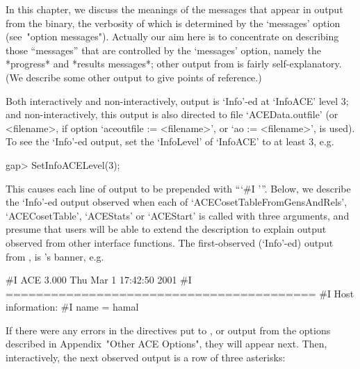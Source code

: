 

In this chapter, we discuss the meanings of the messages  that  appear
in output from the {\ACE} binary, the verbosity of which is determined
by the `messages' option (see~"option  messages").  Actually  our  aim
here is to concentrate  on  describing  those  ``messages''  that  are
controlled  by  the  `messages'  option,  namely  the  *progress*  and
*results   messages*;   other   output   from   {\ACE}    is    fairly
self-explanatory. (We describe some other output  to  give  points  of
reference.)

Both interactively and non-interactively, {\ACE} output  is  `Info'-ed
at `InfoACE' level 3;  and  non-interactively,  this  output  is  also
directed  to  file  `ACEData.outfile'  (or   <filename>,   if   option
`aceoutfile := <filename>', or `ao := <filename>', is  used).  To  see
the `Info'-ed {\ACE} output, set the `InfoLevel' of  `InfoACE'  to  at
least 3, e.g.

\beginexample
gap> SetInfoACELevel(3);
\endexample

This  causes  each  line  of  {\ACE}  output  to  be  prepended   with
```\#I  '''.  Below,  we describe the `Info'-ed output  observed  when
each of `ACECosetTableFromGensAndRels', `ACECosetTable', `ACEStats' or
`ACEStart' is called with three arguments, and presume that users will
be able to extend the description  to  explain  output  observed  from
other  {\ACE}  interface  functions.  The  first-observed  (`Info'-ed)
output from {\ACE}, is {\ACE}'s banner, e.g.

\beginexample
#I  ACE 3.000        Thu Mar  1 17:42:50 2001
#I  =========================================
#I  Host information:
#I    name = hamal
\endexample

If there were any errors in the directives put to  {\ACE},  or  output
from the options described in Appendix~"Other ACE Options", they  will
appear next. Then, interactively, the next observed output is a row of
three asterisks:

